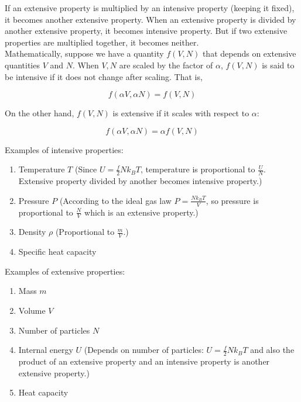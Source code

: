 If an extensive property is multiplied by an intensive property (keeping it fixed), it becomes another extensive property. When an extensive property is divided by another extensive property, it becomes intensive property. But if two extensive properties are multiplied together, it becomes neither. \\

Mathematically, suppose we have a quantity $f(V,N)$ that depends on extensive quantities $V$ and $N$. When $V,N$ are scaled by the factor of $\alpha$, $f(V,N)$ is said to be intensive if it does not change after scaling. That is,

\[f(\alpha V, \alpha N)=f(V,N)\]

On the other hand, $f(V,N)$ is extensive if it scales with respect to $\alpha$:

\[f(\alpha V, \alpha N)=\alpha f(V,N)\]

Examples of intensive properties:

\begin{enumerate}
	\item Temperature $T$ (Since $U=\frac{f}{2}Nk_BT$, temperature is proportional to $\frac{U}{N}$. Extensive property divided by another becomes intensive property.)
	\item Pressure $P$ (According to the ideal gas law $P=\frac{Nk_BT}{V}$, so pressure is proportional to $\frac{N}{V}$ which is an extensive property.)
	\item Density $\rho$ (Proportional to $\frac{m}{V}$.)
	\item Specific heat capacity
\end{enumerate}

Examples of extensive properties:

\begin{enumerate}
	\item Mass $m$
	\item Volume $V$
	\item Number of particles $N$
	\item Internal energy $U$ (Depends on number of particles: $U=\frac{f}{2}Nk_BT$ and also the product of an extensive property and an intensive property is another extensive property.)
	\item Heat capacity
\end{enumerate}

